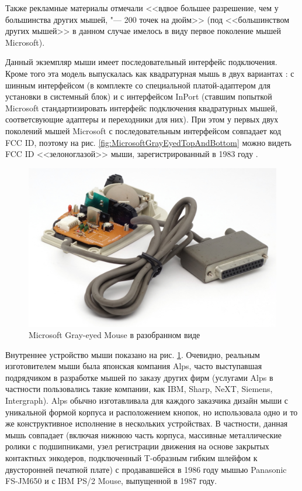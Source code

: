 \documentclass[11pt, a4paper]{article}
\begin{document}
Также рекламные материалы отмечали <<вдвое большее разрешение, чем у большинства других мышей, "--- 200 точек на дюйм>> (под <<большинством других мышей>> в данном случае имелось в виду первое поколение мышей Microsoft).

Данный экземпляр мыши имеет последовательный интерфейс подключения. Кроме того эта модель выпускалась как квадратурная мышь в двух вариантах \cite{guide}: с шинным интерфейсом (в комплекте со специальной платой-адаптером для установки в системный блок) и с интерфейсом InPort (ставшим попыткой Microsoft стандартизировать интерфейс подключения квадратурных мышей,  соответсвующие адаптеры и переходники для них). При этом у первых двух поколений мышей Microsoft с последовательным интерфейсом совпадает код FCC ID, поэтому на рис. \ref{fig:MicrosoftGrayEyedTopAndBottom} можно видеть FCC ID <<зелоноглазой>> мыши, зарегистрированный в 1983 году \cite{zero}.

\begin{figure}[h]
    \centering
    \includegraphics[scale=0.5]{1985_microsoft_gray_eyed_mouse/inside_30.jpg}
    \caption{Microsoft Gray-eyed Mouse в разобранном виде}
    \label{fig:MicrosoftGrayEyedInside}
\end{figure}

Внутреннее устройство мыши показано на рис. \ref{fig:MicrosoftGrayEyedInside}. Очевидно, реальным изготовителем мыши была японская компания Alps, часто выступавшая подрядчиком в разработке мышей по заказу других фирм (услугами Alps в частности пользовались такие компании, как IBM, Sharp, NeXT, Siemens, Intergraph). Alps обычно изготавливала для каждого заказчика дизайн мыши с уникальной формой корпуса и расположением кнопок, но использовала одно и то же конструктивное исполнение в нескольких устройствах. В частности, данная мышь совпадает (включая нижнюю часть корпуса, массивные металлические ролики с подшипниками, узел регистрации движения на основе закрытых контактных энкодеров, подключенный T-образным гибким шлейфом к двусторонней печатной плате) с продававшейся в 1986 году мышью Panasonic FS-JM650 и с IBM PS/2 Mouse, выпущенной в 1987 году.
\end{document}
